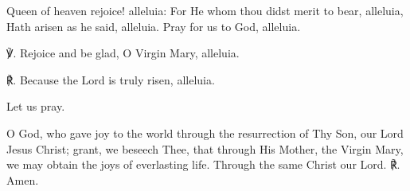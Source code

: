 \begin{otherlanguage}{english}Queen of heaven rejoice! alleluia:
For He whom thou didst merit to bear, alleluia,
Hath arisen as he said, alleluia.
Pray for us to God, alleluia.

℣. Rejoice and be glad, O Virgin Mary, alleluia.

℟. Because the Lord is truly risen, alleluia.

Let us pray.

O God, who gave joy to the world through the resurrection of Thy Son, our Lord Jesus Christ; grant, we beseech Thee, that through His Mother, the Virgin Mary, we may obtain the joys of everlasting life. Through the same Christ our Lord. ℟. Amen.
\end{otherlanguage}